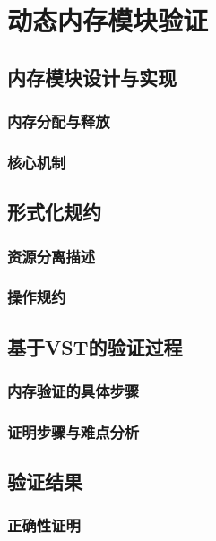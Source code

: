 \chapter{动态内存模块验证}
\section{内存模块设计与实现}
\subsection{内存分配与释放}
\subsection{核心机制}

\section{形式化规约}
\subsection{资源分离描述}
\subsection{操作规约}

\section{基于VST的验证过程}
\subsection{内存验证的具体步骤}
\subsection{证明步骤与难点分析}

\section{验证结果}
\subsection{正确性证明}